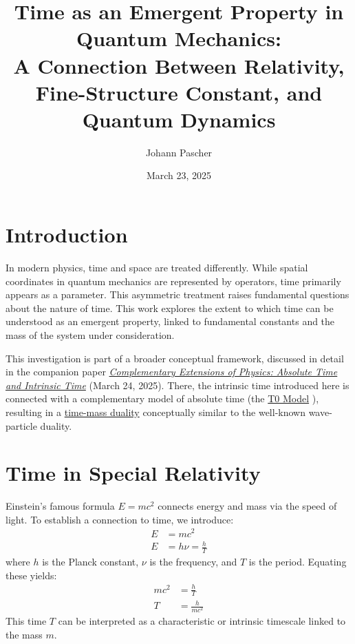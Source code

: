 \documentclass[12pt,a4paper]{article}
\title{Time as an Emergent Property in Quantum Mechanics: \\A Connection Between Relativity, Fine-Structure Constant, and Quantum Dynamics}
\author{Johann Pascher}
\date{March 23, 2025}
\begin{document}
	
	\maketitle
	
	\tableofcontents
	\newpage
	
	\section{Introduction}
	In modern physics, time and space are treated differently. While spatial coordinates in quantum mechanics are represented by operators, time primarily appears as a parameter. This asymmetric treatment raises fundamental questions about the nature of time. This work explores the extent to which time can be understood as an emergent property, linked to fundamental constants and the mass of the system under consideration.
	
	This investigation is part of a broader conceptual framework, discussed in detail in the companion paper \href{https://github.com/jpascher/T0-Time-Mass-Duality/tree/main/2/pdf/English/Komplementäre\%20Erweiterungen\%20der\%20Physik\%20Absolute\%20Zeit\%20und\%20Intrinsische\%20Zeit_en.pdf}{\textit{Complementary Extensions of Physics: Absolute Time and Intrinsic Time}} \cite{pascher1} (March 24, 2025). There, the intrinsic time introduced here is connected with a complementary model of absolute time (the \href{https://github.com/jpascher/T0-Time-Mass-Duality/tree/main/2/pdf/English/Zeit-Masse-Dualitätstheorie\%20(T0-Modell)\%20Herleitung\%20der\%20Parameter\%20kappa,\%20alpha\%20und\%20beta_en.pdf}{T0 Model} \cite{pascher_params_2025}), resulting in a \href{https://github.com/jpascher/T0-Time-Mass-Duality/tree/main/2/pdf/English/Mathematische\%20Formulierungen\%20der\%20Zeit-Masse-Dualitätstheorie\%20mit\%20Lagrange_en.pdf}{time-mass duality} \cite{pascher_lagrange_2025} conceptually similar to the well-known wave-particle duality.
	
	\section{Time in Special Relativity}
	Einstein’s famous formula \( E = mc^2 \) connects energy and mass via the speed of light. To establish a connection to time, we introduce:
	\begin{align}
		E &= mc^2 \\
		E &= h\nu = \frac{h}{T}
	\end{align}
	where \( h \) is the Planck constant, \( \nu \) is the frequency, and \( T \) is the period. Equating these yields:
	\begin{align}
		mc^2 &= \frac{h}{T} \\
		T &= \frac{h}{mc^2}
	\end{align}
	This time \( T \) can be interpreted as a characteristic or intrinsic timescale linked to the mass \( m \).
	
\end{document}
